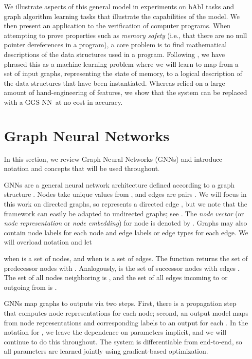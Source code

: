 \documentclass{article} \usepackage{iclr2016_conference,times}
\newcommand{\OurMethodShort}{GGS-NN}
\begin{document}
We illustrate aspects of this general model in experiments on bAbI tasks
\citep{weston2015towards} and graph algorithm
learning tasks that illustrate the capabilities of the model.
We then present an application to the verification of computer programs.
When attempting to prove properties such as \emph{memory safety} (i.e., that
there are no null pointer dereferences in a program), a core problem 
is to find mathematical descriptions of the data structures used in a program.
Following \cite{brockschmidt2015learning}, we have
phrased this as a machine learning problem where we will learn to map
from a set of input graphs, representing the state of memory, to a
logical description of the data structures that have been
instantiated.  Whereas \cite{brockschmidt2015learning} relied on a large amount of
hand-engineering of features, we show that the system can
be replaced with a \OurMethodShort~at no cost in accuracy.



\section{Graph Neural Networks}

In this section, we review Graph Neural Networks (GNNs)
\citep{gori2005new,scarselli2009graph} and introduce notation and concepts that will be
used throughout.

GNNs are a general neural network architecture defined according to a
graph structure .  Nodes 
take unique values from , and edges are pairs
.  We will focus in this
work on directed graphs, so  represents a directed
edge , but we note that the framework can
easily be adapted to undirected graphs; see \cite{scarselli2009graph}.  The
\emph{node vector} (or \emph{node representation} or \emph{node
  embedding}) for node  is denoted by .  Graphs may also contain node labels  for each node  and edge labels or edge types
 for each edge.
We will overload notation and let 
 
when  is a set of nodes, and
 when  is a set of edges.  The function
 returns the
set of predecessor nodes  with .
Analogously,  is the
set of successor nodes  with edges .
The set of all nodes
neighboring  is , and the set of all edges incoming to or outgoing from
 is 
.


GNNs map graphs to outputs via two steps. First, there is a propagation
step that computes node representations for each node; second, an
output model  
maps from node representations and corresponding labels to an output 
for each . In the notation for , we leave the dependence on
parameters implicit, and we will continue to do this throughout.
The system is differentiable from end-to-end,
so all parameters are learned jointly using gradient-based optimization.
\end{document}

